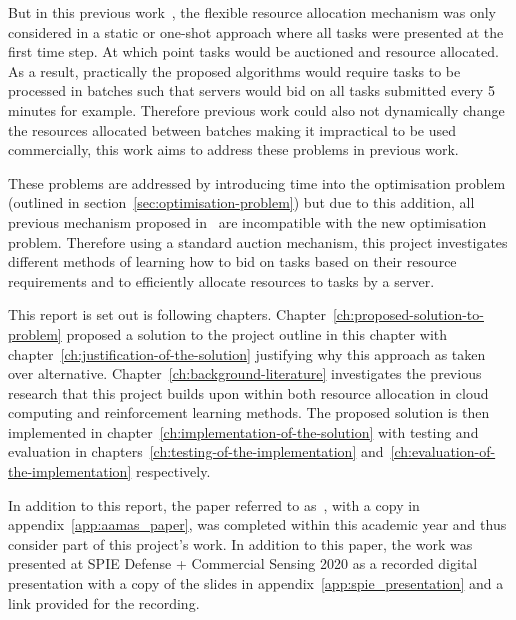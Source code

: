 But in this previous work~\citep{FlexibleResourceAllocation}, the flexible resource allocation mechanism was only
considered in a static or one-shot approach where all tasks were presented at the first time step. At which point tasks
would be auctioned and resource allocated. As a result, practically the proposed algorithms would require tasks to
be processed in batches such that servers would bid on all tasks submitted every 5 minutes for example. Therefore
previous work could also not dynamically change the resources allocated between batches making it impractical to be
used commercially, this work aims to address these problems in previous work.

These problems are addressed by introducing time into the optimisation problem (outlined in
section~\ref{sec:optimisation-problem}) but due to this addition, all previous mechanism proposed
in~\cite{FlexibleResourceAllocation} are incompatible with the new optimisation problem. Therefore using a standard
auction mechanism, this project investigates different methods of learning how to bid on tasks based on their resource
requirements and to efficiently allocate resources to tasks by a server.

This report is set out is following chapters. Chapter~\ref{ch:proposed-solution-to-problem} proposed a solution
to the project outline in this chapter with chapter~\ref{ch:justification-of-the-solution} justifying why this
approach as taken over alternative. Chapter~\ref{ch:background-literature} investigates the previous research
that this project builds upon within both resource allocation in cloud computing and reinforcement learning methods.
The proposed solution is then implemented in chapter~\ref{ch:implementation-of-the-solution} with testing and
evaluation in chapters~\ref{ch:testing-of-the-implementation} and~\ref{ch:evaluation-of-the-implementation} respectively.

In addition to this report, the paper referred to as~\cite{FlexibleResourceAllocation}, with a copy in
appendix~\ref{app:aamas_paper}, was completed within this academic year and thus consider part of this project's work.
In addition to this paper, the work was presented at SPIE Defense + Commercial Sensing 2020 as a recorded digital
presentation with a copy of the slides in appendix~\ref{app:spie_presentation} and a link provided for the recording.

